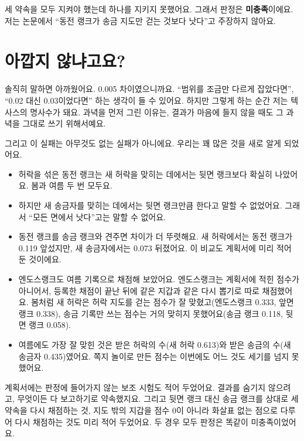 세 약속을 모두 지켜야 했는데 하나를 지키지 못했어요.
그래서 판정은 \textbf{미충족}이에요.
저는 논문에서 “동전 랭크가 송금 지도만 걷는 것보다 낫다”고 주장하지 않아요.

\section{아깝지 않냐고요?}

솔직히 말하면 아까웠어요.
0.005 차이였으니까요.
“범위를 조금만 다르게 잡았다면”, “0.02 대신 0.03이었다면” 하는 생각이 들 수 있어요.
하지만 그렇게 하는 순간 저는 텍사스의 명사수가 돼요.
과녁을 먼저 그린 이유는, 결과가 마음에 들지 않을 때도 그 과녁을 그대로 쓰기 위해서예요.

그리고 이 실패는 아무것도 없는 실패가 아니에요.
우리는 꽤 많은 것을 새로 알게 되었어요.

\begin{itemize}
\item 허락을 섞은 동전 랭크는 새 허락을 맞히는 데에서는 뒷면 랭크보다 확실히 나았어요. 봄과 여름 두 번 모두요.
\item 하지만 새 송금자를 맞히는 데에서는 뒷면 랭크만큼 한다고 말할 수 없었어요. 그래서 “모든 면에서 낫다”고는 말할 수 없어요.
\item 동전 랭크를 송금 랭크와 견주면 차이가 더 뚜렷해요. 새 허락에서는 동전 랭크가 0.119 앞섰지만, 새 송금자에서는 0.073 뒤졌어요.
      이 비교도 계획서에 미리 적어 둔 것이에요.
\item 엔도스랭크도 여름 기록으로 채점해 보았어요.
      엔도스랭크는 계획서에 적힌 점수가 아니어서, 등록한 채점이 끝난 뒤에 같은 지갑과 같은 다시 뽑기로 따로 채점했어요.
      봄처럼 새 허락은 허락 지도를 걷는 점수가 잘 맞혔고(엔도스랭크 0.333, 앞면 랭크 0.338), 송금 기록만 쓰는 점수는 거의 맞히지 못했어요(송금 랭크 0.118, 뒷면 랭크 0.058).
\item 여름에도 가장 잘 맞힌 것은 받은 허락의 수(새 허락 0.613)와 받은 송금의 수(새 송금자 0.435)였어요.
      쪽지 놀이로 만든 점수는 이번에도 어느 것도 세기를 넘지 못했어요.
\end{itemize}

계획서에는 판정에 들어가지 않는 보조 시험도 적어 두었어요.
결과를 숨기지 않으려고, 무엇이든 다 보고하기로 약속했지요.
그리고 뒷면 랭크 대신 송금 랭크를 상대로 세 약속을 다시 채점하는 것,
지도 밖의 지갑을 점수 0이 아니라 화살표 없는 점으로 다루어 다시 채점하는 것도 미리 적어 두었어요.
두 경우 모두 판정은 똑같이 미충족이었어요.

